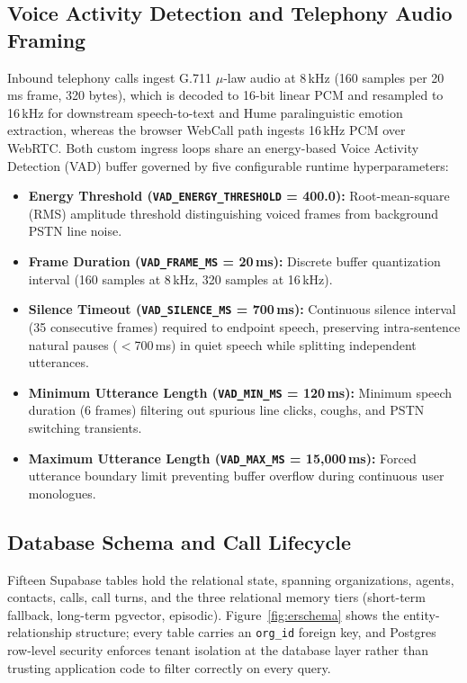 \documentclass[conference]{IEEEtran}
\begin{document}
\subsection{Voice Activity Detection and Telephony Audio Framing}

Inbound telephony calls ingest G.711 $\mu$-law audio at 8\,kHz (160 samples per 20\,ms frame, 320 bytes), which is decoded to 16-bit linear PCM and resampled to 16\,kHz for downstream speech-to-text and Hume paralinguistic emotion extraction, whereas the browser WebCall path ingests 16\,kHz PCM over WebRTC. Both custom ingress loops share an energy-based Voice Activity Detection (VAD) buffer governed by five configurable runtime hyperparameters:

\begin{itemize}
    \item \textbf{Energy Threshold (\texttt{VAD\_ENERGY\_THRESHOLD} = 400.0):} Root-mean-square (RMS) amplitude threshold distinguishing voiced frames from background PSTN line noise.
    \item \textbf{Frame Duration (\texttt{VAD\_FRAME\_MS} = 20\,ms):} Discrete buffer quantization interval (160 samples at 8\,kHz, 320 samples at 16\,kHz).
    \item \textbf{Silence Timeout (\texttt{VAD\_SILENCE\_MS} = 700\,ms):} Continuous silence interval (35 consecutive frames) required to endpoint speech, preserving intra-sentence natural pauses ($<$700\,ms) in quiet speech while splitting independent utterances.
    \item \textbf{Minimum Utterance Length (\texttt{VAD\_MIN\_MS} = 120\,ms):} Minimum speech duration (6 frames) filtering out spurious line clicks, coughs, and PSTN switching transients.
    \item \textbf{Maximum Utterance Length (\texttt{VAD\_MAX\_MS} = 15,000\,ms):} Forced utterance boundary limit preventing buffer overflow during continuous user monologues.
\end{itemize}

\subsection{Database Schema and Call Lifecycle}

Fifteen Supabase tables hold the relational state, spanning organizations, agents, contacts, calls, call turns, and the three relational memory tiers (short-term fallback, long-term pgvector, episodic). Figure~\ref{fig:erschema} shows the entity-relationship structure; every table carries an \texttt{org\_id} foreign key, and Postgres row-level security enforces tenant isolation at the database layer rather than trusting application code to filter correctly on every query.
\end{document}
